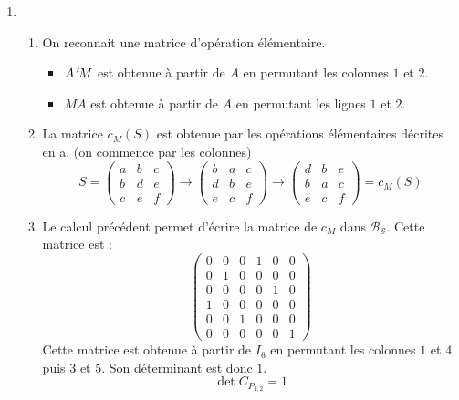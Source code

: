 \begin{enumerate}
\item \begin{enumerate}
 \item On reconnait une matrice d'opération élémentaire.
\begin{itemize}
 \item $A\,\mathstrut^t\! M$ est obtenue à partir de $A$ en permutant les colonnes $1$ et $2$.
 \item $M A$ est obtenue à partir de $A$ en permutant les lignes $1$ et $2$.
\end{itemize}
\item La matrice $c_M(S)$ est obtenue par les opérations élémentaires décrites en a. (on commence par les colonnes)
\begin{displaymath}
S =
\begin{pmatrix}
 a & b & c \\ b & d & e \\ c & e & f
\end{pmatrix}
\rightarrow
\begin{pmatrix}
 b & a & c \\ d & b & e \\ e & c & f
\end{pmatrix}
\rightarrow
\begin{pmatrix}
 d & b & e \\ b & a & c \\ e & c & f
\end{pmatrix}
= c_M(S)
\end{displaymath}
\item Le calcul précédent permet d'écrire la matrice de $c_M$ dans $\mathcal B_{\mathcal S}$. Cette matrice est :
\begin{displaymath}
 \begin{pmatrix}
0 & 0 & 0 & 1 & 0 & 0 \\ 
0 & 1 & 0 & 0 & 0 & 0 \\ 
0 & 0 & 0 & 0 & 1 & 0 \\ 
1 & 0 & 0 & 0 & 0 & 0 \\ 
0 & 0 & 1 & 0 & 0 & 0 \\ 
0 & 0 & 0 & 0 & 0 & 1 
 \end{pmatrix}
\end{displaymath}
Cette matrice est obtenue à partir de $I_6$ en permutant les colonnes $1$ et $4$ puis $3$ et $5$. Son déterminant est donc $1$.
\begin{displaymath}
 \det C_{P_{1,2}}=1
\end{displaymath}
\end{enumerate}


\end{enumerate}
